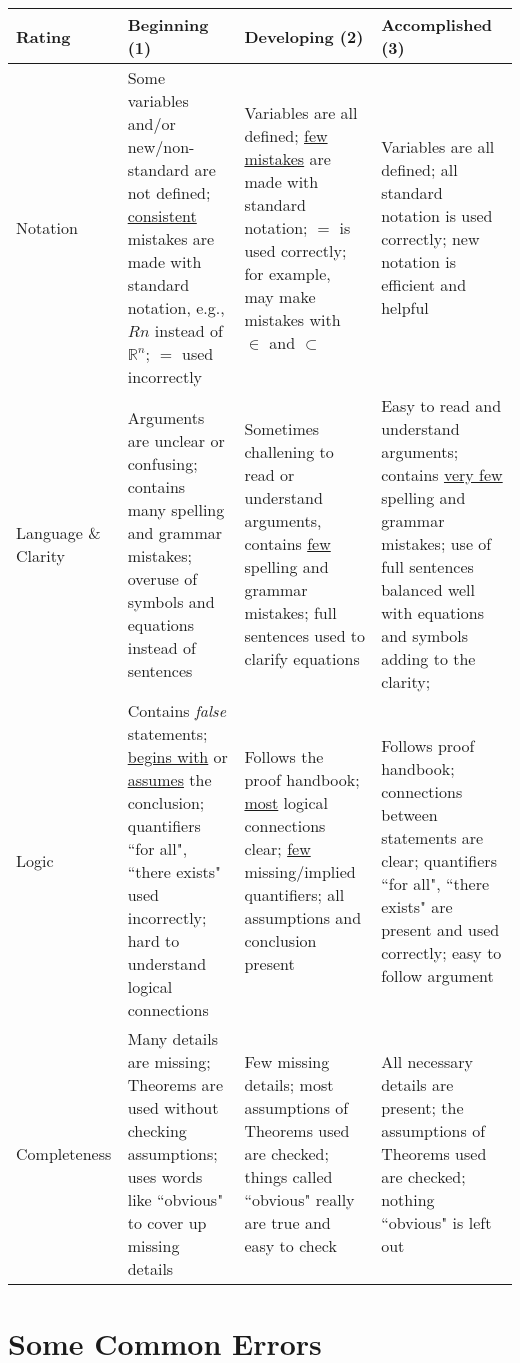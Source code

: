 \documentclass[11pt]{amsart}
\newcommand\R{\mathbb R}    %
\begin{document}
\begin{center}
\begin{tabular}{|p{2.3cm}||p{4.5cm} |p{4.5cm} |p{4.5cm} |}
\hline
	\textbf{Rating} & \qquad \qquad \textbf{Beginning (1)}  & \quad \qquad  \textbf{Developing (2)}   &  \qquad \textbf{Accomplished (3)}  \\
\hline
\hline
Notation & Some variables and/or new/non-standard are not defined; \underline{consistent} mistakes are made with standard notation, e.g., $Rn$ instead of $\R^n$; $=$ used incorrectly & Variables are all defined; \underline{few mistakes} are made with standard notation; $=$ is used correctly; for example, may make mistakes with $\in$ and $\subset$ & Variables are all defined; all standard notation is used correctly; new notation is efficient and helpful\\
\hline
Language \& Clarity & Arguments are unclear or confusing; contains many spelling and grammar mistakes; overuse of symbols and equations instead of sentences  &  Sometimes challening to read or understand arguments, contains \underline{few} spelling and grammar mistakes; full sentences used to clarify equations & Easy to read and understand arguments; contains \underline{very few} spelling and grammar mistakes; use of full sentences balanced well with equations and symbols adding to the clarity; \\
\hline
Logic & Contains \textit{false} statements; \underline{begins with} or \underline{assumes} the conclusion; quantifiers ``for all", ``there exists" used incorrectly; hard to understand logical connections & Follows the proof handbook; \underline{most} logical connections clear; \underline{few} missing/implied quantifiers; all assumptions and conclusion present & Follows proof handbook; connections between statements are clear; quantifiers ``for all", ``there exists" are present and used correctly; easy to follow argument  \\
\hline
Completeness & Many details are missing; Theorems are used without checking assumptions; uses words like ``obvious" to cover up missing details & Few missing details; most assumptions of Theorems used are checked; things called ``obvious" really are true and easy to check & All necessary details are present; the assumptions of Theorems used are checked; nothing ``obvious" is left out \\
\hline
\end{tabular}
\end{center}

\section*{Some Common Errors}
\end{document}
